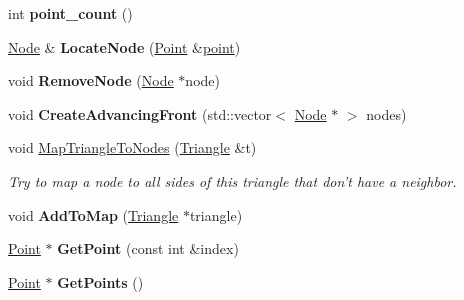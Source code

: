 \begin{DoxyCompactItemize}
\item 
\hypertarget{classp2t_1_1_sweep_context_a4ef94d299d632dee275dd511d7434c2d}{int {\bfseries point\+\_\+count} ()}\label{classp2t_1_1_sweep_context_a4ef94d299d632dee275dd511d7434c2d}

\item 
\hypertarget{classp2t_1_1_sweep_context_a501b441e104acc9504e5c3aa471b2f32}{\hyperlink{structp2t_1_1_node}{Node} \& {\bfseries Locate\+Node} (\hyperlink{structp2t_1_1_point}{Point} \&\hyperlink{structpoint}{point})}\label{classp2t_1_1_sweep_context_a501b441e104acc9504e5c3aa471b2f32}

\item 
\hypertarget{classp2t_1_1_sweep_context_a0ea069bc88f6f7cd4b0022d988017d8d}{void {\bfseries Remove\+Node} (\hyperlink{structp2t_1_1_node}{Node} $\ast$node)}\label{classp2t_1_1_sweep_context_a0ea069bc88f6f7cd4b0022d988017d8d}

\item 
\hypertarget{classp2t_1_1_sweep_context_a09710e3b918586ccfed9f96553896a29}{void {\bfseries Create\+Advancing\+Front} (std\+::vector$<$ \hyperlink{structp2t_1_1_node}{Node} $\ast$ $>$ nodes)}\label{classp2t_1_1_sweep_context_a09710e3b918586ccfed9f96553896a29}

\item 
\hypertarget{classp2t_1_1_sweep_context_aa1c59ec4b2bc6d6f3b248c452d6993c1}{void \hyperlink{classp2t_1_1_sweep_context_aa1c59ec4b2bc6d6f3b248c452d6993c1}{Map\+Triangle\+To\+Nodes} (\hyperlink{classp2t_1_1_triangle}{Triangle} \&t)}\label{classp2t_1_1_sweep_context_aa1c59ec4b2bc6d6f3b248c452d6993c1}

\begin{DoxyCompactList}\small\item\em Try to map a node to all sides of this triangle that don't have a neighbor. \end{DoxyCompactList}\item 
\hypertarget{classp2t_1_1_sweep_context_a9ae8715f961ca7e61cc5a986f6afbe12}{void {\bfseries Add\+To\+Map} (\hyperlink{classp2t_1_1_triangle}{Triangle} $\ast$triangle)}\label{classp2t_1_1_sweep_context_a9ae8715f961ca7e61cc5a986f6afbe12}

\item 
\hypertarget{classp2t_1_1_sweep_context_a72e8032e135d9cd6c44b2d93cbfbc033}{\hyperlink{structp2t_1_1_point}{Point} $\ast$ {\bfseries Get\+Point} (const int \&index)}\label{classp2t_1_1_sweep_context_a72e8032e135d9cd6c44b2d93cbfbc033}

\item 
\hypertarget{classp2t_1_1_sweep_context_ae37f1dcc28825cffc9a0a7509686167f}{\hyperlink{structp2t_1_1_point}{Point} $\ast$ {\bfseries Get\+Points} ()}\label{classp2t_1_1_sweep_context_ae37f1dcc28825cffc9a0a7509686167f}


\end{DoxyCompactItemize}
